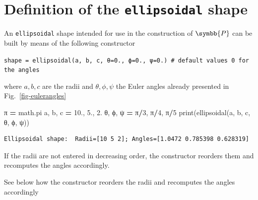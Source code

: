 \documentclass[
  a4paper,
  numbers=noendperiod,
  DIV=12]{scrreprt}
\newenvironment{Shaded}{\begin{snugshade}}{\end{snugshade}}
\newcommand{\BuiltInTok}[1]{#1}
\newcommand{\DecValTok}[1]{\textcolor[rgb]{0.00,0.00,0.81}{#1}}
\newcommand{\FloatTok}[1]{\textcolor[rgb]{0.00,0.00,0.81}{#1}}
\newcommand{\NormalTok}[1]{#1}
\newcommand{\OperatorTok}[1]{\textcolor[rgb]{0.81,0.36,0.00}{\textbf{#1}}}
\newcommand{\uuuu}[1]{{\symbb{{#1}}}}
\begin{document}
\section{\texorpdfstring{Definition of the \texttt{ellipsoidal}
shape}{Definition of the ellipsoidal shape}}\label{sec-ellipsoidal}

An \texttt{ellipsoidal} shape intended for use in the construction of
\(\uuuu{P}\) can be built by means of the following constructor

\texttt{shape\ =\ ellipsoidal(a,\ b,\ c,\ θ=0.,\ ϕ=0.,\ ψ=0.)\ \#\ default\ values\ 0\ for\ the\ angles}

where \(a, b, c\) are the radii and \(\theta, \phi, \psi\) the Euler
angles already presented in Fig.~\ref{fig-eulerangles}

\begin{Shaded}
\begin{Highlighting}[]
\NormalTok{π }\OperatorTok{=}\NormalTok{ math.pi}
\NormalTok{a, b, c }\OperatorTok{=} \FloatTok{10.}\NormalTok{, }\FloatTok{5.}\NormalTok{, }\FloatTok{2.}
\NormalTok{θ, ϕ, ψ }\OperatorTok{=}\NormalTok{ π}\OperatorTok{/}\DecValTok{3}\NormalTok{, π}\OperatorTok{/}\DecValTok{4}\NormalTok{, π}\OperatorTok{/}\DecValTok{5}
\BuiltInTok{print}\NormalTok{(ellipsoidal(a, b, c, θ, ϕ, ψ))}
\end{Highlighting}
\end{Shaded}

\begin{verbatim}
Ellipsoidal shape:  Radii=[10 5 2]; Angles=[1.0472 0.785398 0.628319]
\end{verbatim}

\begin{tcolorbox}[enhanced jigsaw, arc=.35mm, bottomrule=.15mm, bottomtitle=1mm, breakable, colback=white, colbacktitle=quarto-callout-warning-color!10!white, colframe=quarto-callout-warning-color-frame, coltitle=black, left=2mm, leftrule=.75mm, opacityback=0, opacitybacktitle=0.6, rightrule=.15mm, title=\textcolor{quarto-callout-warning-color}{\faExclamationTriangle}\hspace{0.5em}{Warning}, titlerule=0mm, toprule=.15mm, toptitle=1mm]

If the radii are not entered in decreasing order, the constructor
reorders them and recomputes the angles accordingly.

\end{tcolorbox}

See below how the constructor reorders the radii and recomputes the
angles accordingly
\end{document}

